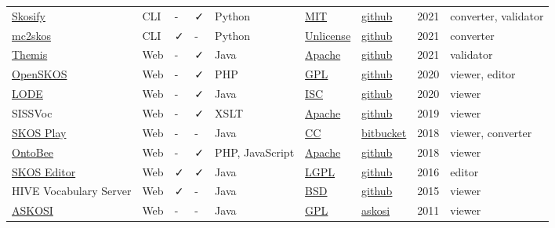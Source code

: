 \documentclass[
  DIV=10]{article}
\begin{document}
\begin{longtable}[]{@{}lllllllll@{}}
\href{https://skosify.readthedocs.io/en/latest/}{Skosify} & CLI & - & ✓
& Python & \href{https://spdx.org/licenses/MIT}{MIT} &
\href{https://github.com/NatLibFi/Skosify}{github} & 2021 & converter,
validator \\
\href{https://github.com/scriptotek/mc2skos}{mc2skos} & CLI & ✓ & - &
Python & \href{https://spdx.org/licenses/Unlicense}{Unlicense} &
\href{https://github.com/scriptotek/mc2skos}{github} & 2021 &
converter \\
\href{http://themis.linkeddata.es/}{Themis} & Web & - & ✓ & Java &
\href{https://spdx.org/licenses/Apache-2.0}{Apache} &
\href{https://github.com/oeg-upm/Themis}{github} & 2021 & validator \\
\href{http://openskos.org/}{OpenSKOS} & Web & - & ✓ & PHP &
\href{https://spdx.org/licenses/GPL-3.0-or-later}{GPL} &
\href{https://github.com/OpenSKOS/OpenSKOS}{github} & 2020 & viewer,
editor \\
\href{https://essepuntato.it/lode/}{LODE} & Web & - & ✓ & Java &
\href{https://spdx.org/licenses/ISC}{ISC} &
\href{https://github.com/essepuntato/LODE}{github} & 2020 & viewer \\
SISSVoc & Web & - & ✓ & XSLT &
\href{https://spdx.org/licenses/Apache-2.0}{Apache} &
\href{https://github.com/SISS/sissvoc}{github} & 2019 & viewer \\
\href{https://skos-play.sparna.fr/play/about}{SKOS Play} & Web & - & - &
Java & \href{https://spdx.org/licenses/CC-BY-SA-4.0}{CC} &
\href{https://bitbucket.org/tfrancart/sparna/src/master/}{bitbucket} &
2018 & viewer, converter \\
\href{https://ontobee.org/}{OntoBee} & Web & - & ✓ & PHP, JavaScript &
\href{https://spdx.org/licenses/Apache-2.0}{Apache} &
\href{https://github.com/OntoZoo/ontobee}{github} & 2018 & viewer \\
\href{https://jbiomedsem.biomedcentral.com/articles/10.1186/s13326-015-0043-z}{SKOS
Editor} & Web & ✓ & ✓ & Java &
\href{https://spdx.org/licenses/LGPL-3.0-or-later}{LGPL} &
\href{https://github.com/Blulab-Utah/SKOSEditor}{github} & 2016 &
editor \\
HIVE Vocabulary Server & Web & ✓ & - & Java &
\href{https://spdx.org/licenses/BSD-3-Clause}{BSD} &
\href{https://github.com/MetadataResearchCenter/hive-mrc}{github} & 2015
& viewer \\
\href{http://www.askosi.org/}{ASKOSI} & Web & - & - & Java &
\href{https://spdx.org/licenses/GPL-3.0-or-later}{GPL} &
\href{http://www.askosi.org/example/}{askosi} & 2011 & viewer \\

\end{longtable}
\end{document}
